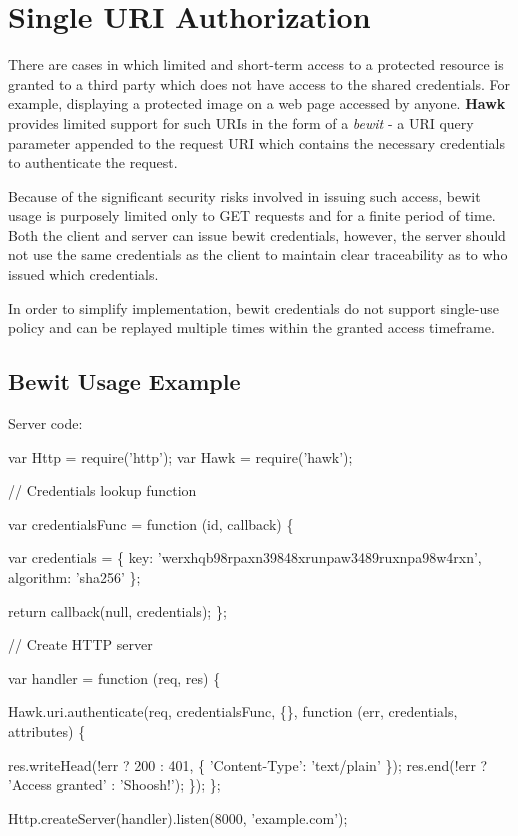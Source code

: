 \section*{Single U\+RI Authorization}

There are cases in which limited and short-\/term access to a protected resource is granted to a third party which does not have access to the shared credentials. For example, displaying a protected image on a web page accessed by anyone. {\bfseries Hawk} provides limited support for such U\+R\+Is in the form of a {\itshape bewit} -\/ a U\+RI query parameter appended to the request U\+RI which contains the necessary credentials to authenticate the request.

Because of the significant security risks involved in issuing such access, bewit usage is purposely limited only to G\+ET requests and for a finite period of time. Both the client and server can issue bewit credentials, however, the server should not use the same credentials as the client to maintain clear traceability as to who issued which credentials.

In order to simplify implementation, bewit credentials do not support single-\/use policy and can be replayed multiple times within the granted access timeframe.

\subsection*{Bewit Usage Example}

Server code\+:


\begin{DoxyCode}
var Http = require('http');
var Hawk = require('hawk');


// Credentials lookup function

var credentialsFunc = function (id, callback) \{

    var credentials = \{
        key: 'werxhqb98rpaxn39848xrunpaw3489ruxnpa98w4rxn',
        algorithm: 'sha256'
    \};

    return callback(null, credentials);
\};

// Create HTTP server

var handler = function (req, res) \{

    Hawk.uri.authenticate(req, credentialsFunc, \{\}, function (err, credentials, attributes) \{

        res.writeHead(!err ? 200 : 401, \{ 'Content-Type': 'text/plain' \});
        res.end(!err ? 'Access granted' : 'Shoosh!');
    \});
\};

Http.createServer(handler).listen(8000, 'example.com');
\end{DoxyCode}


